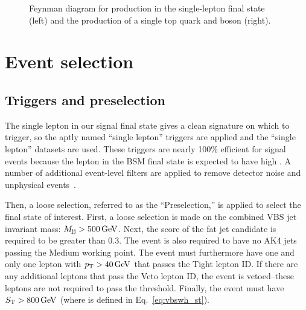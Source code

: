 \begin{figure}[htb]
    \centering
    \quad
    \caption[Feynman diagrams for \wjets and $\PQt\PW$ production]{
        Feynman diagram for \wjets production in the single-lepton final state (left) and the production of a single top quark and \PW boson (right). 
    }
    \label{fig:vbswh_subl_bkg} %
\end{figure}

\section{Event selection}
\subsection{Triggers and preselection}
The single lepton in our signal final state gives a clean signature on which to trigger, so the aptly named ``single lepton'' triggers are applied and the ``single lepton'' datasets are used. 
These triggers are nearly 100\% efficient for signal events because the lepton in the BSM final state is expected to have high \pt. 
A number of additional event-level filters are applied to remove detector noise and unphysical events~\cite{JMEPaper}. 

Then, a loose selection, referred to as the ``Preselection,'' is applied to select the final state of interest. 
First, a loose selection is made on the combined VBS jet invariant mass: $M_{\mathrm{j}\mathrm{j}} > 500\,\text{Ge\hspace{-.08em}V}$.
Next, the \ParticleNet \Xtobb score of the \Htobb fat jet candidate is required to be greater than 0.3.
The event is also required to have no AK4 jets passing the Medium \DeepJet working point.
The event must furthermore have one and only one lepton with $p_{\mathrm{T}} > 40\,\text{Ge\hspace{-.08em}V}$ that passes the Tight lepton ID. 
If there are any additional leptons that pass the Veto lepton ID, the event is vetoed--these leptons are not required to pass the \pt threshold. 
Finally, the event must have $S_{\mathrm{T}} > 800\,\text{Ge\hspace{-.08em}V}$ (where \ST is defined in Eq.~\ref{eq:vbswh_st}).

